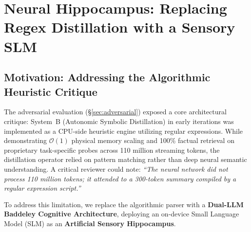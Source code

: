 \documentclass[11pt,a4paper]{article}
\begin{document}
\section{Neural Hippocampus: Replacing Regex Distillation with a Sensory SLM}
\label{sec:hippocampus}

\subsection{Motivation: Addressing the Algorithmic Heuristic Critique}
The adversarial evaluation (\S\ref{sec:adversarial}) exposed a core architectural critique: System~B (Autonomic Symbolic Distillation) in early iterations was implemented as a CPU-side heuristic engine utilizing regular expressions. While demonstrating $\mathcal{O}(1)$ physical memory scaling and 100\% factual retrieval on proprietary task-specific probes across 110 million streaming tokens, the distillation operator relied on pattern matching rather than deep neural semantic understanding. A critical reviewer could note: \emph{``The neural network did not process 110 million tokens; it attended to a 300-token summary compiled by a regular expression script.''}

To address this limitation, we replace the algorithmic parser with a \textbf{Dual-LLM Baddeley Cognitive Architecture}, deploying an on-device Small Language Model (SLM) as an \textbf{Artificial Sensory Hippocampus}.
\end{document}
